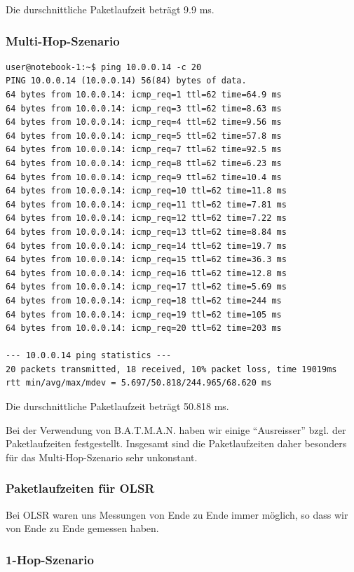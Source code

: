 \documentclass[a4paper,10pt]{article}
\begin{document}
Die durschnittliche Paketlaufzeit beträgt 9.9 ms.

\subsubsection*{Multi-Hop-Szenario}

\begin{lstlisting}
user@notebook-1:~$ ping 10.0.0.14 -c 20
PING 10.0.0.14 (10.0.0.14) 56(84) bytes of data.
64 bytes from 10.0.0.14: icmp_req=1 ttl=62 time=64.9 ms
64 bytes from 10.0.0.14: icmp_req=3 ttl=62 time=8.63 ms
64 bytes from 10.0.0.14: icmp_req=4 ttl=62 time=9.56 ms
64 bytes from 10.0.0.14: icmp_req=5 ttl=62 time=57.8 ms
64 bytes from 10.0.0.14: icmp_req=7 ttl=62 time=92.5 ms
64 bytes from 10.0.0.14: icmp_req=8 ttl=62 time=6.23 ms
64 bytes from 10.0.0.14: icmp_req=9 ttl=62 time=10.4 ms
64 bytes from 10.0.0.14: icmp_req=10 ttl=62 time=11.8 ms
64 bytes from 10.0.0.14: icmp_req=11 ttl=62 time=7.81 ms
64 bytes from 10.0.0.14: icmp_req=12 ttl=62 time=7.22 ms
64 bytes from 10.0.0.14: icmp_req=13 ttl=62 time=8.84 ms
64 bytes from 10.0.0.14: icmp_req=14 ttl=62 time=19.7 ms
64 bytes from 10.0.0.14: icmp_req=15 ttl=62 time=36.3 ms
64 bytes from 10.0.0.14: icmp_req=16 ttl=62 time=12.8 ms
64 bytes from 10.0.0.14: icmp_req=17 ttl=62 time=5.69 ms
64 bytes from 10.0.0.14: icmp_req=18 ttl=62 time=244 ms
64 bytes from 10.0.0.14: icmp_req=19 ttl=62 time=105 ms
64 bytes from 10.0.0.14: icmp_req=20 ttl=62 time=203 ms

--- 10.0.0.14 ping statistics --- 
20 packets transmitted, 18 received, 10% packet loss, time 19019ms
rtt min/avg/max/mdev = 5.697/50.818/244.965/68.620 ms
\end{lstlisting}

Die durschnittliche Paketlaufzeit beträgt 50.818 ms.

Bei der Verwendung von B.A.T.M.A.N. haben wir einige "`Ausreisser"' bzgl. der Paketlaufzeiten festgestellt.
Insgesamt sind die Paketlaufzeiten daher besonders für das Multi-Hop-Szenario sehr unkonstant.

\subsubsection{Paketlaufzeiten für OLSR}

Bei OLSR waren uns Messungen von Ende zu Ende immer möglich, so dass wir von Ende zu Ende gemessen haben.

\subsubsection*{1-Hop-Szenario}
\end{document}
